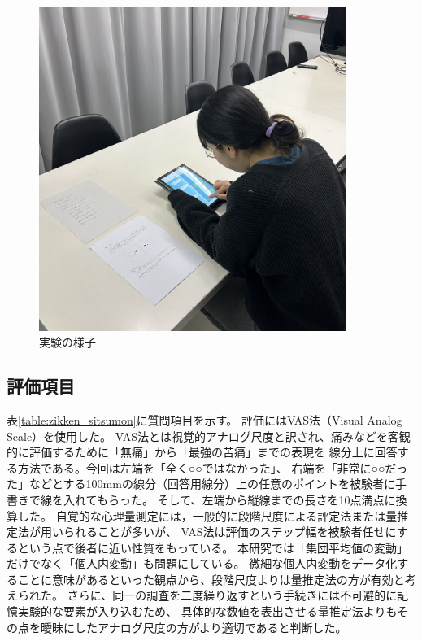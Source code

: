 \documentclass[11pt,a4paper]{ltjsreport}
\begin{document}
\begin{figure}[htbp]
    \begin{center}
        \includegraphics[width=100mm]{PDF/zikken_yousu.jpg}
        \caption{実験の様子}
        \label{figure:zikken_yousu}
    \end{center}
\end{figure}

\subsection{評価項目}
表\ref{table:zikken_sitsumon}に質問項目を示す。
評価にはVAS法（Visual Analog Scale）を使用した\cite{Thesis_Takahashi1}\cite{Thesis_Takahashi2}。
VAS法とは視覚的アナログ尺度と訳され、痛みなどを客観的に評価するために「無痛」から「最強の苦痛」までの表現を
線分上に回答する方法である\cite{Thesis_vas}。今回は左端を「全く○○ではなかった」、
右端を「非常に○○だった」などとする100mmの線分（回答用線分）上の任意のポイントを被験者に手書きで線を入れてもらった。
そして、左端から縦線までの長さを10点満点に換算した。 
自覚的な心理量測定には，一般的に段階尺度による評定法または量推定法が用いられることが多いが、
VAS法は評価のステップ幅を被験者任せにするという点で後者に近い性質をもっている。
本研究では「集団平均値の変動」だけでなく「個人内変動」も問題にしている。
微細な個人内変動をデータ化することに意味があるといった観点から、段階尺度よりは量推定法の方が有効と考えられた。
さらに、同一の調査を二度繰り返すという手続きには不可避的に記憶実験的な要素が入り込むため、
具体的な数値を表出させる量推定法よりもその点を曖昧にしたアナログ尺度の方がより適切であると判断した。
\end{document}
